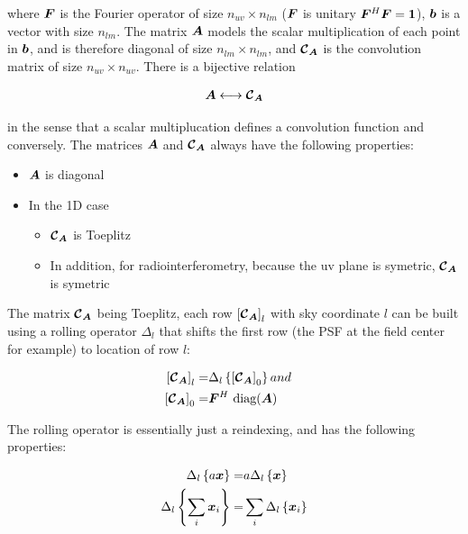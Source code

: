 \noindent where $\bm{F}$ is the Fourier operator of size 
$n_{uv}\times n_{lm}$ ($\bm{F}$ is unitary $\bm{F}^H\bm{F}=\bm{1}$), $\bm{b}$ is
a vector with size $n_{lm}$. The matrix $\bm{A}$ models the scalar
multiplication of each point in $\bm{b}$, and is therefore diagonal of
size $n_{lm}\times n_{lm}$, and $\bm{\mathcal{C}}_{\bm{A}}$ is the convolution matrix
of size $n_{uv}\times n_{uv}$. There is a bijective relation

\begin{alignat}{2}
\label{eq:ConvTh}
\bm{A} \longleftrightarrow \bm{\mathcal{C}}_{\bm{A}}
\end{alignat}
 
\noindent in the sense that a scalar multiplucation defines a convolution
function and conversely. The matrices $\bm{A}$ and $\bm{\mathcal{C}}_{\bm{A}}$ always
have the following properties:

\begin{itemize}
  \item $\bm{A}$ is diagonal

   \item In the 1D case
\begin{itemize}
  \item $\bm{\mathcal{C}}_{\bm{A}}$ is Toeplitz
  \item In addition, for radiointerferometry, because the uv plane is symetric, $\bm{\mathcal{C}}_{\bm{A}}$ is symetric
\end{itemize}

\end{itemize}

The matrix $\bm{\mathcal{C}}_{\bm{A}}$ being Toeplitz, each row $\left[ \bm{\mathcal{C}}_{\bm{A}}
  \right]_l$ with sky coordinate $l$ can be built using a
rolling operator $\Delta_l$ that shifts the first row (the PSF at the field
center for example) to location of row $l$:

\begin{alignat}{2}
\label{eq:ConvTh}
\left[ \bm{\mathcal{C}}_{\bm{A}} \right]_l =& \Delta_l \left\{ \left[ \bm{\mathcal{C}}_{\bm{A}} \right]_0 \right\}
and&\\
\left[ \bm{\mathcal{C}}_{\bm{A}} \right]_0 =& \bm{F}^H \ \text{diag}(\bm{A})
\end{alignat}

The rolling operator is essentially just a reindexing, and has the
following properties:

\begin{alignat}{2}
\label{eq:PropsDelta0}
\Delta_l \left\{ a\bm{x} \right\} =&  a \Delta_l \left\{\bm{x} \right\} \\
\label{eq:PropsDelta1}
\Delta_l \left\{ \sum_i \bm{x}_i \right\} =& \sum_i \Delta_l \left\{ \bm{x}_i \right\} 
\end{alignat}

